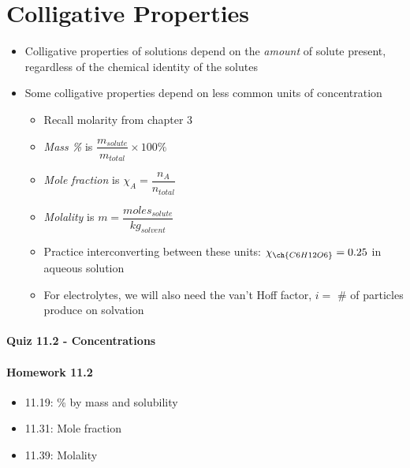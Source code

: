 \documentclass[12pt, openany, letterpaper]{memoir}
\begin{document}
\section{Colligative Properties}
\begin{itemize}
  \item Colligative properties of solutions depend on the \emph{amount} of solute present, regardless of the chemical identity of the solutes
  \item Some colligative properties depend on less common units of concentration
  \begin{itemize}
    \item Recall molarity from chapter 3
    \item \emph{Mass \%} is $\dfrac{m_{solute}}{m_{total}}\times 100\%$
    \item \emph{Mole fraction} is $\chi_A=\dfrac{n_A}{n_{total}}$
    \item \emph{Molality} is $m=\dfrac{moles_{solute}}{kg_{solvent}}$
    \item Practice interconverting between these units: $\chi_{\ch{C6H12O6}}=0.25$ in aqueous solution
    \item For electrolytes, we will also need the van't Hoff factor, $i = $ \# of particles produce on solvation
  \end{itemize}
\end{itemize}

\paragraph*{Quiz 11.2 - Concentrations}
\paragraph*{Homework 11.2}
\begin{itemize}
  \item 11.19: \% by mass and solubility
  \item 11.31: Mole fraction
  \item 11.39: Molality
\end{itemize}
\end{document}
